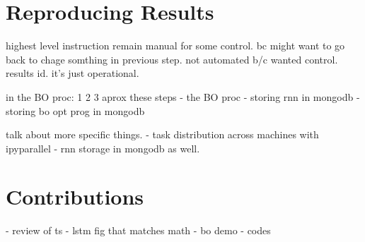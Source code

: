 
%




\chapter{Reproducing Results}
\label{ch:reproduce}

highest level instruction remain manual for some control. bc might want to go back to chage somthing in previous step.
not automated b/c wanted control. results id. it's just operational.

in the BO proc: 1 2 3 aprox these steps
- the BO proc
- storing rnn in mongodb
- storing bo opt prog in mongodb

talk about more specific things.
- task distribution across machines with ipyparallel
- rnn storage in mongodb as well.

\chapter{Contributions}

- review of ts
- lstm fig that matches math
- bo demo
- codes

